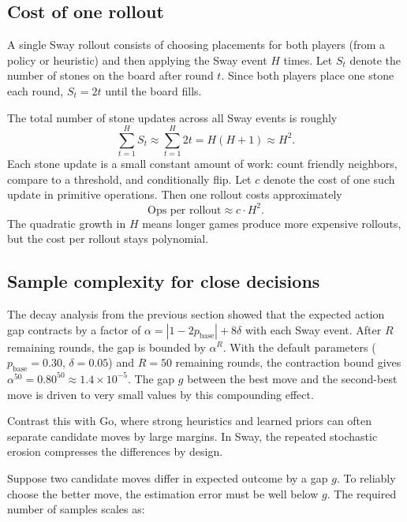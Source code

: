 \subsection{Cost of one rollout}

A single Sway rollout consists of choosing placements for both players (from a policy or heuristic) and then applying the Sway event $H$ times.
Let $S_t$ denote the number of stones on the board after round $t$.
Since both players place one stone each round, $S_t = 2t$ until the board fills.

The total number of stone updates across all Sway events is roughly
\begin{equation}
\sum_{t=1}^{H} S_t \approx \sum_{t=1}^{H} 2t = H(H+1) \approx H^2.
\end{equation}
Each stone update is a small constant amount of work: count friendly neighbors, compare to a threshold, and conditionally flip.
Let $c$ denote the cost of one such update in primitive operations.
Then one rollout costs approximately
\begin{equation}
\text{Ops per rollout} \approx c \cdot H^2.
\end{equation}
The quadratic growth in $H$ means longer games produce more expensive rollouts, but the cost per rollout stays polynomial.

\subsection{Sample complexity for close decisions}

The decay analysis from the previous section showed that the expected action gap contracts by a factor of $\alpha = |1 - 2p_{\text{base}}| + 8\delta$ with each Sway event.
After $R$ remaining rounds, the gap is bounded by $\alpha^R$.
With the default parameters ($p_{\text{base}} = 0.30$, $\delta = 0.05$) and $R = 50$ remaining rounds, the contraction bound gives $\alpha^{50} = 0.80^{50} \approx 1.4 \times 10^{-5}$.
The gap $g$ between the best move and the second-best move is driven to very small values by this compounding effect.

Contrast this with Go, where strong heuristics and learned priors can often separate candidate moves by large margins.
In Sway, the repeated stochastic erosion compresses the differences by design.

Suppose two candidate moves differ in expected outcome by a gap $g$.
To reliably choose the better move, the estimation error must be well below $g$.
The required number of samples scales as:

